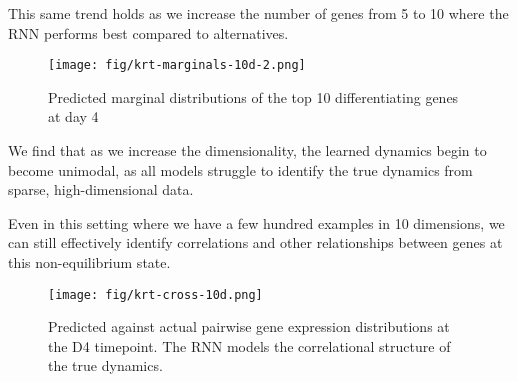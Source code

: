 \documentclass{article}
\begin{document}
This same trend holds as we increase the number of genes from 5 to 10 where the RNN performs best compared to alternatives.
\begin{figure}[h]
\texttt{[image: fig/krt-marginals-10d-2.png]}
\caption{Predicted marginal distributions of the top 10 differentiating genes at day 4}
\label{fig:10dmarg}
\end{figure}
We find that as we increase the dimensionality, the learned dynamics begin to become unimodal, as all models struggle to identify the true dynamics from sparse, high-dimensional data.

Even in this setting where we have a few hundred examples in 10 dimensions, we can still effectively identify correlations and other relationships between genes at this non-equilibrium state.
\begin{figure}[h]
\texttt{[image: fig/krt-cross-10d.png]}
\caption{Predicted against actual pairwise gene expression distributions at the D4 timepoint. The RNN models the correlational structure of the true dynamics.}
\label{fig:10dcor}
\end{figure}
\end{document}
